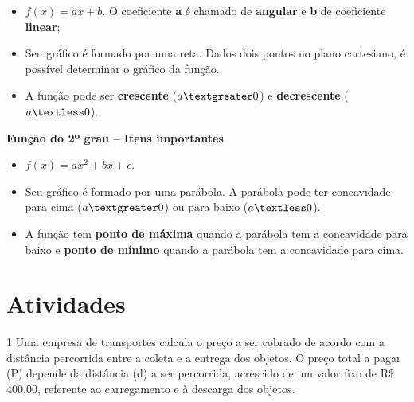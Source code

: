 \begin{escolha}
\begin{boxmedio}
\begin{boxmedio}
{\begin{boxpeq}
\begin{boxpeq}
{\begin{boxpeq}
\begin{boxmedio}
\begin{boxmedio}
\begin{boxpeq}
\begin{boxmedio}
\begin{boxpeq}
\begin{boxpeq}
\begin{boxpeq}
\begin{boxpeq}
\begin{boxmedio}
{\begin{boxmedio}
\begin{boxmedio}
\begin{boxpeq}
\begin{boxmedio}
\begin{boxpeq}
\begin{boxpeq}
\begin{boxpeq}
\begin{escolha}
{\begin{boxmedio}
\begin{boxpeq}
\begin{boxpeq}
\begin{boxpeq}
\begin{boxpeq}
\begin{boxpeq}
\begin{boxmedio}
\begin{boxpeq}
\begin{boxpeq}
\begin{boxpeq}
{\begin{boxpeq}
\begin{boxmedio}
\begin{boxpeq}
\begin{boxpeq}
\begin{boxpeq}
{\begin{boxpeq}
\begin{boxmedio}
{\begin{itemize}
  \item $f(x) = ax + b$. O coeficiente \textbf{a} é chamado de \textbf{angular}
  e \textbf{b} de coeficiente \textbf{linear};
  
  \item Seu gráfico é formado por uma reta. Dados dois pontos no plano cartesiano,
  é possível determinar o gráfico da função.
  
  \item A função pode ser \textbf{crescente} ($a\textgreater0$) e 
  \textbf{decrescente} ($a\textless0$).

\end{itemize}

\textbf{Função do 2º grau -- Itens importantes}

\begin{itemize}
  
  \item $f(x) = ax^2 + bx + c$.
  
  \item Seu gráfico é formado por uma parábola. A parábola pode ter concavidade
  para cima ($a\textgreater0$) ou para baixo ($a\textless0$).
  
  \item A função tem \textbf{ponto de máxima} quando a parábola tem a concavidade para baixo e \textbf{ponto de mínimo} quando a parábola tem a
  concavidade para cima.

\end{itemize}

\section{Atividades}

\num{1} Uma empresa de transportes calcula o preço a ser cobrado de acordo
com a distância percorrida entre a coleta e a entrega dos objetos. O
preço total a pagar (P) depende da distância (d) a ser percorrida,
acrescido de um valor fixo de R\$ 400,00, referente ao carregamento e à
descarga dos objetos.

}
\end{boxmedio}
\end{boxpeq}}
\end{boxpeq}
\end{boxpeq}
\end{boxpeq}
\end{boxmedio}
\end{boxpeq}}
\end{boxpeq}
\end{boxpeq}
\end{boxpeq}
\end{boxmedio}
\end{boxpeq}
\end{boxpeq}
\end{boxpeq}
\end{boxpeq}
\end{boxpeq}
\end{boxmedio}}
\end{escolha}
\end{boxpeq}
\end{boxpeq}
\end{boxpeq}
\end{boxmedio}
\end{boxpeq}
\end{boxmedio}
\end{boxmedio}}
\end{boxmedio}
\end{boxpeq}
\end{boxpeq}
\end{boxpeq}
\end{boxpeq}
\end{boxmedio}
\end{boxpeq}
\end{boxmedio}
\end{boxmedio}
\end{boxpeq}}
\end{boxpeq}
\end{boxpeq}}
\end{boxmedio}
\end{boxmedio}
\end{escolha}

